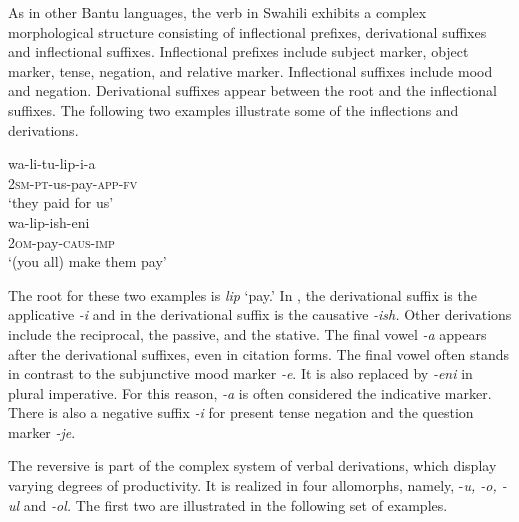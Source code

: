 \documentclass[output=paper]{langsci/langscibook}
\begin{document}
As in other Bantu languages, the verb in Swahili exhibits a complex morphological structure consisting of inflectional prefixes, derivational suffixes and inflectional suffixes. Inflectional prefixes include subject marker, object marker, tense, negation, and relative marker. Inflectional suffixes include mood and negation. Derivational suffixes appear between the root and the inflectional suffixes. The following two examples illustrate some of the inflections and derivations.

\ea\label{ex:ngonyaningowa:2}
\ea\label{ex:ngonyaningowa:2a}
\gll wa-li-tu-lip-i-a \\
  2\textsc{sm}-\textsc{pt}-us-pay-\textsc{app}-\textsc{fv} \\
\glt  ‘they paid for us’ \\

\ex\label{ex:ngonyaningowa:2b}  
\gll wa-lip-ish-eni \\
  2\textsc{om}-pay-\textsc{caus}-\textsc{imp} \\
\glt  ‘(you all) make them pay’ 
\z
\z 

The root for these two examples is \textit{lip} ‘pay.’ In , the derivational suffix is the applicative \textit{{}-i} and in  the derivational suffix is the causative \textit{{}-ish.} Other derivations include the reciprocal, the passive, and the stative. The final vowel \textit{{}-a} appears after the derivational suffixes, even in citation forms. The final vowel often stands in contrast to the subjunctive mood marker \textit{{}-e}. It is also replaced by \textit{{}-eni} in plural imperative. For this reason, \textit{{}-a} is often considered the indicative marker. There is also a negative suffix \textit{{}-i} for present tense negation and the question marker \textit{{}-je}.

The reversive is part of the complex system of verbal derivations, which display varying degrees of productivity. It is realized in four allomorphs, namely, -\textit{u, -o, -ul} and \textit{{}-ol.} The first two are illustrated in the following set of examples.

\ea\label{ex:ngonyaningowa:3}
\ea\label{ex:ngonyaningowa:3a}  
\ex\label{ex:ngonyaningowa:3b}
\ex\label{ex:ngonyaningowa:3c}
\ex\label{ex:ngonyaningowa:3d}
\ex\label{ex:ngonyaningowa:3e}
\z
\z
\end{document}
